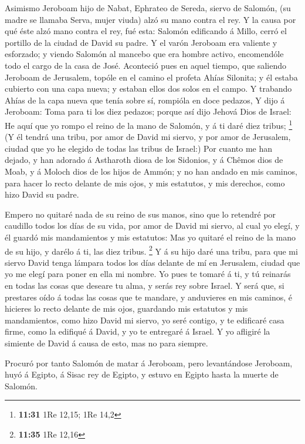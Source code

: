  Asimismo Jeroboam hijo de Nabat, Ephrateo de Sereda,
siervo de Salomón, (su madre se llamaba Serva, mujer viuda) alzó su mano
contra el rey.  Y la causa por qué éste alzó mano contra el
rey, fué esta: Salomón edificando á Millo, cerró el portillo de la
ciudad de David su padre.  Y el varón Jeroboam era valiente
y esforzado; y viendo Salomón al mancebo que era hombre activo,
encomendóle todo el cargo de la casa de José.  Aconteció
pues en aquel tiempo, que saliendo Jeroboam de Jerusalem, topóle en el
camino el profeta Ahías Silonita; y él estaba cubierto con una capa
nueva; y estaban ellos dos solos en el campo.  Y trabando
Ahías de la capa nueva que tenía sobre sí, rompióla en doce pedazos,
 Y dijo á Jeroboam: Toma para ti los diez pedazos; porque
así dijo Jehová Dios de Israel: He aquí que yo rompo el reino de la mano
de Salomón, y á ti daré diez tribus; \footnote{\textbf{11:31} 1Re 12,15;
  1Re 14,2}  (Y él tendrá una tribu, por amor de David mi
siervo, y por amor de Jerusalem, ciudad que yo he elegido de todas las
tribus de Israel:)  Por cuanto me han dejado, y han adorado
á Astharoth diosa de los Sidonios, y á Chêmos dios de Moab, y á Moloch
dios de los hijos de Ammón; y no han andado en mis caminos, para hacer
lo recto delante de mis ojos, y mis estatutos, y mis derechos, como hizo
David su padre.

 Empero no quitaré nada de su reino de sus manos, sino que
lo retendré por caudillo todos los días de su vida, por amor de David mi
siervo, al cual yo elegí, y él guardó mis mandamientos y mis estatutos:
 Mas yo quitaré el reino de la mano de su hijo, y darélo á
ti, las diez tribus. \footnote{\textbf{11:35} 1Re 12,16}  Y
á su hijo daré una tribu, para que mi siervo David tenga lámpara todos
los días delante de mí en Jerusalem, ciudad que yo me elegí para poner
en ella mi nombre.  Yo pues te tomaré á ti, y tú reinarás
en todas las cosas que deseare tu alma, y serás rey sobre Israel.
 Y será que, si prestares oído á todas las cosas que te
mandare, y anduvieres en mis caminos, é hicieres lo recto delante de mis
ojos, guardando mis estatutos y mis mandamientos, como hizo David mi
siervo, yo seré contigo, y te edificaré casa firme, como la edifiqué á
David, y yo te entregaré á Israel.  Y yo afligiré la
simiente de David á causa de esto, mas no para siempre.

 Procuró por tanto Salomón de matar á Jeroboam, pero
levantándose Jeroboam, huyó á Egipto, á Sisac rey de Egipto, y estuvo en
Egipto hasta la muerte de Salomón.

